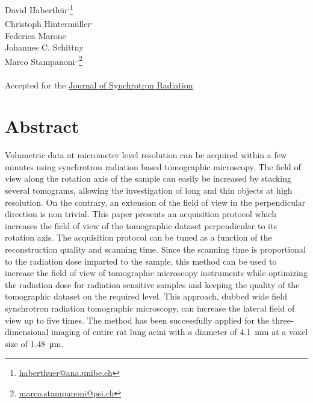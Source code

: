 \acresetall
{}\label{ch:haberthuer2010}

David Haberthür\textsuperscript{,}\footnote{\href{mailto:haberthuer@ana.unibe.ch}{haberthuer@ana.unibe.ch}}\\
Christoph Hintermüller\textsuperscript{,}\\
Federica Marone\\
Johannes C. Schittny\\
Marco Stampanoni\textsuperscript{,}\textsuperscript{,}\footnote{\href{mailto:marco.stampanoni@psi.ch}{marco.stampanoni@psi.ch}}\\\\
Accepted for the \href{http://journals.iucr.org/s/}{Journal of Synchrotron Radiation}\\
\vfill
\section{Abstract}
Volumetric data at micrometer level resolution can be acquired within a few minutes using synchrotron radiation based tomographic microscopy. The field of view along the rotation axis of the sample can easily be increased by stacking several tomograms, allowing  the investigation of long and thin objects at high resolution. On the contrary, an extension of the field of view in the perpendicular direction is non trivial. This paper presents an acquisition protocol which increases the field of view of the tomographic dataset perpendicular to its rotation axis. The acquisition protocol can be tuned as a function of the reconstruction quality and scanning time. Since the scanning time is proportional to the radiation dose imparted to the sample, this method can be used to increase the field of view of tomographic microscopy instruments while optimizing the radiation dose for radiation sensitive samples and keeping the quality of the tomographic dataset on the required level. This approach, dubbed wide field synchrotron radiation tomographic microscopy, can increase the lateral field of view up to five times. The method has been successfully applied for the three-dimensional imaging of entire rat lung acini with a diameter of \SI{4.1}{\milli\meter} at a voxel size of \SI{1.48}{\micro\meter}.
\clearpage

